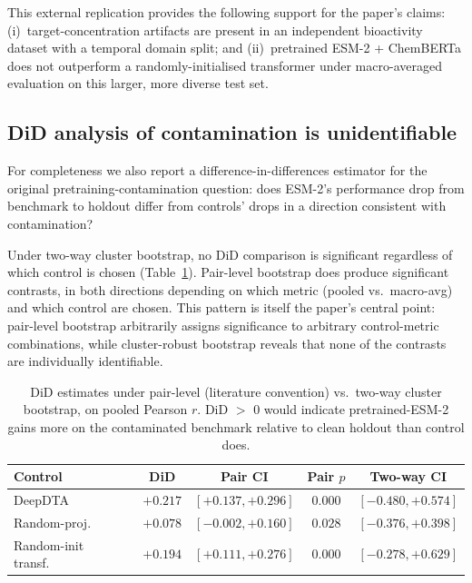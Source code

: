 \documentclass[11pt,a4paper]{article}
\begin{document}
This external replication provides the following support for the paper's claims:
(i)~target-concentration artifacts are present in an independent bioactivity
dataset with a temporal domain split; and (ii)~pretrained ESM-2 + ChemBERTa
does not outperform a randomly-initialised transformer under macro-averaged
evaluation on this larger, more diverse test set.

\subsection{DiD analysis of contamination is unidentifiable}

For completeness we also report a difference-in-differences estimator for the
original pretraining-contamination question: does ESM-2's performance drop
from benchmark to holdout differ from controls' drops in a direction consistent
with contamination?

Under two-way cluster bootstrap, no DiD comparison is significant regardless of
which control is chosen (Table~\ref{tab:did}).
Pair-level bootstrap does produce significant contrasts, in both directions
depending on which metric (pooled vs.\ macro-avg) and which control are
chosen.
This pattern is itself the paper's central point: pair-level bootstrap
arbitrarily assigns significance to arbitrary control-metric combinations,
while cluster-robust bootstrap reveals that none of the contrasts are
individually identifiable.

\begin{table}[h]
\centering
\caption{DiD estimates under pair-level (literature convention) vs.\ two-way
cluster bootstrap, on pooled Pearson $r$. DiD $>$ 0 would indicate
pretrained-ESM-2 gains more on the contaminated benchmark relative to clean
holdout than control does.}
\label{tab:did}
\begin{tabular}{lcccc}
\toprule
\textbf{Control} & \textbf{DiD} & \textbf{Pair CI} & \textbf{Pair $p$} & \textbf{Two-way CI} \\
\midrule
DeepDTA           & $+0.217$ & $[+0.137, +0.296]$ & $0.000$ & $[-0.480, +0.574]$ \\
Random-proj.      & $+0.078$ & $[-0.002, +0.160]$ & $0.028$ & $[-0.376, +0.398]$ \\
Random-init transf.\ & $+0.194$ & $[+0.111, +0.276]$ & $0.000$ & $[-0.278, +0.629]$ \\
\bottomrule
\end{tabular}
\end{table}
\end{document}
